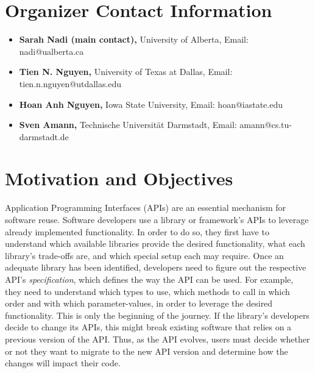 \documentclass[10pt, conference]{IEEEtran}
\begin{document}
\section{Organizer Contact Information}
\begin{itemize}
\setlength\itemsep{5pt}
\item \textbf{Sarah Nadi (main contact),} University of Alberta, Email: nadi@ualberta.ca
\item \textbf{Tien N. Nguyen,} University of Texas at Dallas, Email: tien.n.nguyen@utdallas.edu
\item \textbf{Hoan Anh Nguyen,} Iowa State University, Email: hoan@iastate.edu
\item \textbf{Sven Amann,} Technische Universit\"{a}t Darmstadt, Email: amann@cs.tu-darmstadt.de
\end{itemize}

\section{Motivation and Objectives}
Application Programming Interfaces (APIs) are an essential mechanism for software reuse. Software developers use a library or framework's APIs to leverage already implemented functionality. In order to do so, they first have to understand which available libraries provide the desired functionality, what each library's trade-offs are, and which special setup each may require. Once an adequate library has been identified, developers need to figure out the respective API's \textit{specification}, which defines the way the API can be used. For example, they need to understand which types to use, which methods to call in which order and with which parameter-values, in order to leverage the desired functionality. This is only the beginning of the journey. If the library's developers decide to change its APIs, this might break existing software that relies on a previous version of the API. Thus, as the API evolves, users must decide whether or not they want to migrate to the new API version and determine how the changes will impact their code.
\end{document}
